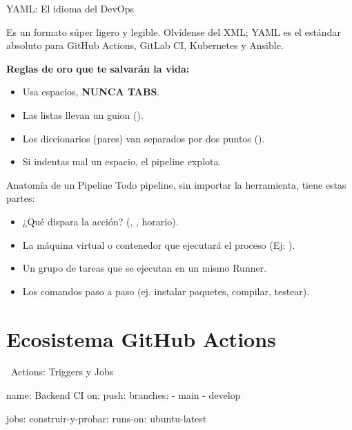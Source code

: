 \documentclass[aspectratio=169]{beamer}
\begin{document}
\begin{frame}{YAML: El idioma del DevOps}
    \begin{orangebox}
        Es un formato súper ligero y legible. Olvídense del XML; YAML es el estándar absoluto para GitHub Actions, GitLab CI, Kubernetes y Ansible.
    \end{orangebox}
    
    \vspace{0.5cm}
    \textbf{Reglas de oro que te salvarán la vida:}
    \begin{itemize}
        \item {} Usa espacios, \textbf{NUNCA TABS}.
        \item Las listas llevan un guion (\inlinecode{-}).
        \item Los diccionarios (pares) van separados por dos puntos (\inlinecode{:}).
        \item Si indentas mal un espacio, el pipeline explota.
    \end{itemize}
\end{frame}

\begin{frame}{Anatomía de un Pipeline}
    Todo pipeline, sin importar la herramienta, tiene estas partes:
    
    \vspace{0.3cm}
    \begin{itemize}
        \item {} ¿Qué dispara la acción? (, , horario).
        \item {} La máquina virtual o contenedor que ejecutará el proceso (Ej: ).
        \item {} Un grupo de tareas que se ejecutan en un mismo Runner.
        \item {} Los comandos paso a paso (ej. instalar paquetes, compilar, testear).
    \end{itemize}
\end{frame}

\section{Ecosistema GitHub Actions}

\begin{frame}[fragile]{\faGithub\ Actions: Triggers y Jobs}
    \begin{codebox}
\begin{yamlcode}
name: Backend CI
on:
  push:
    branches:
      - main
      - develop

jobs:
  construir-y-probar:
    runs-on: ubuntu-latest
\end{yamlcode}
    \end{codebox}
\end{frame}
\end{document}
